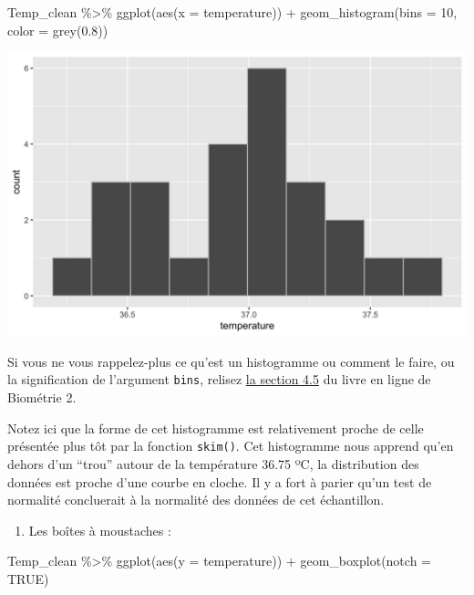 \documentclass[
  a4paper,
]{article}
\newenvironment{Shaded}{\begin{snugshade}}{\end{snugshade}}
\newcommand{\AttributeTok}[1]{\textcolor[rgb]{0.00,0.34,0.68}{#1}}
\newcommand{\ConstantTok}[1]{\textcolor[rgb]{0.67,0.33,0.00}{#1}}
\newcommand{\DecValTok}[1]{\textcolor[rgb]{0.69,0.50,0.00}{#1}}
\newcommand{\FloatTok}[1]{\textcolor[rgb]{0.69,0.50,0.00}{#1}}
\newcommand{\FunctionTok}[1]{\textcolor[rgb]{0.39,0.29,0.61}{#1}}
\newcommand{\NormalTok}[1]{\textcolor[rgb]{0.12,0.11,0.11}{#1}}
\newcommand{\SpecialCharTok}[1]{\textcolor[rgb]{0.24,0.68,0.91}{#1}}
\providecommand{\tightlist}{%
  \setlength{\itemsep}{0pt}\setlength{\parskip}{0pt}}
\begin{document}
\begin{Shaded}
\begin{Highlighting}[]
\NormalTok{Temp\_clean }\SpecialCharTok{\%\textgreater{}\%} 
  \FunctionTok{ggplot}\NormalTok{(}\FunctionTok{aes}\NormalTok{(}\AttributeTok{x =}\NormalTok{ temperature)) }\SpecialCharTok{+}
  \FunctionTok{geom\_histogram}\NormalTok{(}\AttributeTok{bins =} \DecValTok{10}\NormalTok{, }\AttributeTok{color =} \FunctionTok{grey}\NormalTok{(}\FloatTok{0.8}\NormalTok{))}
\end{Highlighting}
\end{Shaded}

\begin{center}\includegraphics[width=0.9\linewidth]{figure/unnamed-chunk-18-1} \end{center}

Si vous ne vous rappelez-plus ce qu'est un histogramme ou comment le faire, ou la signification de l'argument \texttt{bins}, relisez \href{https://besibo.github.io/DA/viz.html\#histogram}{la section 4.5} du livre en ligne de Biométrie 2.

Notez ici que la forme de cet histogramme est relativement proche de celle présentée plus tôt par la fonction \texttt{skim()}. Cet histogramme nous apprend qu'en dehors d'un ``trou'' autour de la température 36.75 ºC, la distribution des données est proche d'une courbe en cloche. Il y a fort à parier qu'un test de normalité concluerait à la normalité des données de cet échantillon.

\begin{enumerate}
\def\labelenumi{\arabic{enumi}.}
\setcounter{enumi}{2}
\tightlist
\item
  Les boîtes à moustaches :
\end{enumerate}

\begin{Shaded}
\begin{Highlighting}[]
\NormalTok{Temp\_clean }\SpecialCharTok{\%\textgreater{}\%} 
  \FunctionTok{ggplot}\NormalTok{(}\FunctionTok{aes}\NormalTok{(}\AttributeTok{y =}\NormalTok{ temperature)) }\SpecialCharTok{+}
  \FunctionTok{geom\_boxplot}\NormalTok{(}\AttributeTok{notch =} \ConstantTok{TRUE}\NormalTok{)}
\end{Highlighting}
\end{Shaded}
\end{document}
